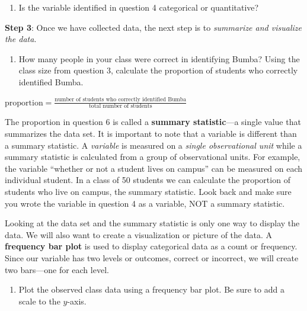 \documentclass[
]{report}
\providecommand{\tightlist}{%
  \setlength{\itemsep}{0pt}\setlength{\parskip}{0pt}}
\begin{document}
\begin{enumerate}
\def\labelenumi{\arabic{enumi}.}
\setcounter{enumi}{4}
\tightlist
\item
  Is the variable identified in question 4 categorical or quantitative?
\end{enumerate}

\vspace{0.3in}

\textbf{Step 3}: Once we have collected data, the next step is to \emph{summarize and visualize the data}.

\begin{enumerate}
\def\labelenumi{\arabic{enumi}.}
\setcounter{enumi}{5}
\tightlist
\item
  How many people in your class were correct in identifying Bumba? Using the class size from question 3, calculate the proportion of students who correctly identified Bumba.
\end{enumerate}

\begin{center}
$\mbox{proportion} = \frac{\mbox{number of students who correctly identified Bumba}}{\mbox{total number of students}}$
\end{center}

\vspace{0.7in}

The proportion in question 6 is called a \textbf{summary statistic}---a single value that summarizes the data set. It is important to note that a variable is different than a summary statistic. A \emph{variable} is measured on a \emph{single observational unit} while a summary statistic is calculated from a group of observational units. For example, the variable ``whether or not a student lives on campus'' can be measured on each individual student. In a class of 50 students we can calculate the proportion of students who live on campus, the summary statistic. Look back and make sure you wrote the variable in question 4 as a variable, NOT a summary statistic.

Looking at the data set and the summary statistic is only one way to display the data. We will also want to create a visualization or picture of the data. A \textbf{frequency bar plot} is used to display categorical data as a count or frequency. Since our variable has two levels or outcomes, correct or incorrect, we will create two bars---one for each level.

\begin{enumerate}
\def\labelenumi{\arabic{enumi}.}
\setcounter{enumi}{6}
\tightlist
\item
  Plot the observed class data using a frequency bar plot. Be sure to add a scale to the \(y\)-axis.
\end{enumerate}
\end{document}
